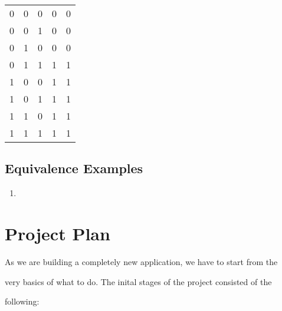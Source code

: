 \documentclass[12pt]{article}
\begin{document}
\begin{enumerate}
\begin{center}
\begin{tabular}{| c | c | c | c | c |}
    0 & 0 & 0 & 0 & 0 \\

    0 & 0 & 1 & 0 & 0 \\

    0 & 1 & 0 & 0 & 0 \\

    0 & 1 & 1 & 1 & 1 \\

    1 & 0 & 0 & 1 & 1 \\

    1 & 0 & 1 & 1 & 1 \\

    1 & 1 & 0 & 1 & 1 \\

    1 & 1 & 1 & 1 & 1 \\ \hline

  \end{tabular}

\end{center}

\end{enumerate}



\subsection{Equivalence Examples}

\begin{enumerate}

	\item 

\begin{alttt}



\end{alttt}		

\end{enumerate}



\newpage




\section{Project Plan}

As we are building a completely new application, we have to start from the

very basics of what to do. The inital stages of the project consisted of the

following:
\end{document}
